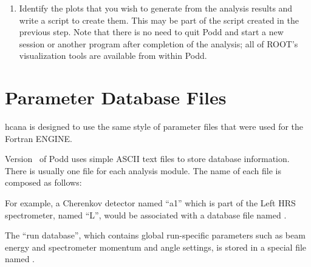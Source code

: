 {{\begin{enumerate}
	in Step~\ref{offl:item:step3}. Often, a script from a
	previous experiment, or one of the examples in
	the directory , can serve as a guide.
	The script usually also locates raw data files, creates
	one or more  objects, configures various
	options of the event loop object , and
	starts the replay. In particular, the names of the output
	file, the output definition file, and the logicals definition
	file must be given to .
  \item Identify the plots that you wish to generate from the analysis
        results and write a script to create them. This may be part
	of the script created in the previous step. 
	Note that there is no need to quit Podd and start a new
	session or another program after completion of the analysis; all of
	ROOT's visualization tools are available from within Podd.
\end{enumerate}

\section{Parameter Database Files}
\label{offl:sec:database}
hcana is designed to use the same style of parameter files that were
used for the Fortran ENGINE.

Version \cppaver\ of Podd uses simple ASCII text files
to store database information. There is usually one file for each 
analysis module. The name of each file is composed as follows:\\

\noindent {}
\vspace{2ex}

For example, a Cherenkov detector named ``a1'' which is part of the
Left HRS spectrometer, named ``L'', would be associated with 
a database file named .

The ``run database'', which contains global run-specific parameters
such as beam energy and spectrometer momentum and angle settings,
is stored in a special file named .

}}
